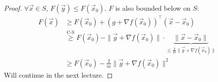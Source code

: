 \documentclass{article}
\newcommand{\x}{\vec{x}}
\begin{document}
\begin{proof}
    $\forall \x \in S$, $F(\vec{y}) \leq F(\x_0)$. $F$ is also bounded below on $S$:
    \begin{align*}
        F(\x) &\geq F(\x_0) + (g + \nabla f(\x_0))^\top(\x - \x_0) \\
        &\overset{\text{C-S}}{\geq} F(\x_0) - \|\vec{g} + \nabla f(\x_0)\| \cdot \underbrace{\|\x - \x_0\|}_{\leq \frac{2}{m}\|\vec{g} + \nabla f(\x_0)\|} \\
        &\geq F(\x_0) - \frac{2}{m}\|\vec{g} + \nabla f(\x_0)\|^2
    \end{align*}
    Will continue in the next lecture.
\end{proof}
\end{document}
